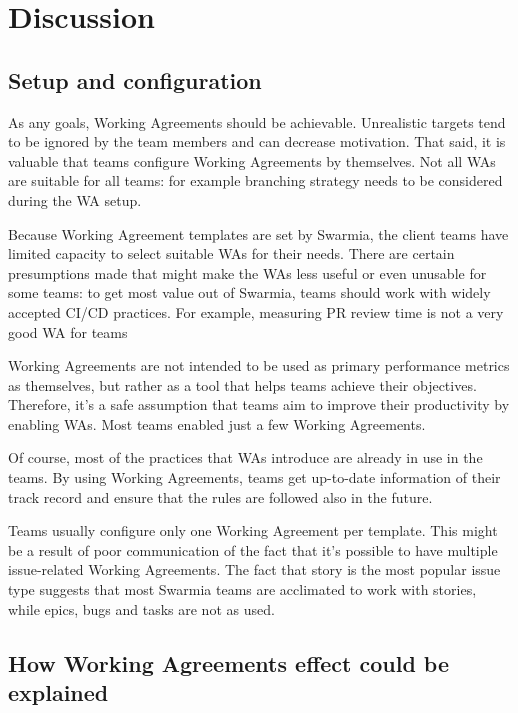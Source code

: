 \chapter{Discussion}

\section{Setup and configuration}

As any goals, Working Agreements should be achievable. Unrealistic targets tend to be ignored by the team members and can decrease motivation. That said, it is valuable that teams configure Working Agreements by themselves. Not all WAs are suitable for all teams: for example branching strategy needs to be considered during the WA setup.  

Because Working Agreement templates are set by Swarmia, the client teams have limited capacity to select suitable WAs for their needs. There are certain presumptions made that might make the WAs less useful or even unusable for some teams: to get most value out of Swarmia, teams should work with widely accepted CI/CD practices. For example, measuring PR review time is not a very good WA for teams 

Working Agreements are not intended to be used as primary performance metrics as themselves, but rather as a tool that helps teams achieve their objectives. Therefore, it's a safe assumption that teams aim to improve their productivity by enabling WAs. Most teams enabled just a few Working Agreements. 

Of course, most of the practices that WAs introduce are already in use in the teams. By using Working Agreements, teams get up-to-date information of their track record and ensure that the rules are followed also in the future.  



Teams usually configure only one Working Agreement per template. This might be a result of poor communication of the fact that it's possible to have multiple issue-related Working Agreements. The fact that story is the most popular issue type suggests that most Swarmia teams are acclimated to work with stories, while epics, bugs and tasks are not as used. 

\section{How Working Agreements effect could be explained}

